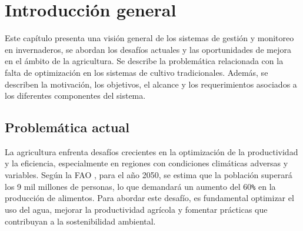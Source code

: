
\chapter{Introducción general} %

\label{Chapter1} %
\label{IntroGeneral}

Este capítulo presenta una visión general de los sistemas de gestión y
monitoreo en invernaderos, se abordan los desafíos actuales y las oportunidades
de mejora en el ámbito de la agricultura. Se describe la problemática
relacionada con la falta de optimización en los sistemas de cultivo
tradicionales. Además, se describen la motivación, los objetivos, el alcance y
los requerimientos asociados a los diferentes componentes del sistema.


\newcommand{\keyword}[1]{\textbf{#1}}
\newcommand{\tabhead}[1]{\textbf{#1}}
\newcommand{\code}[1]{\texttt{#1}}
\newcommand{\file}[1]{\texttt{\bfseries#1}}
\newcommand{\option}[1]{\texttt{\itshape#1}}
\newcommand{\grados}{$^{\circ}$}



\section{Problemática actual}

La agricultura enfrenta desafíos crecientes en la optimización de la
productividad y la eficiencia, especialmente en regiones con condiciones
climáticas adversas y variables. Según la FAO \cite{GAPReport2016}, para el año
2050, se estima que la población superará los 9 mil millones de personas, lo
que demandará un aumento del 60\code{\%} en la producción de alimentos. Para
abordar este desafío, es fundamental optimizar el uso del agua, mejorar la
productividad agrícola y fomentar prácticas que contribuyan a la sostenibilidad
ambiental.

